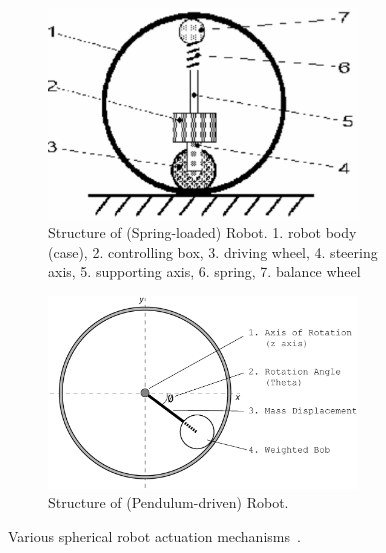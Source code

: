 \documentclass[english, bachelor, utf8]{base/thesis_telematics}
\begin{document}
\begin{figure}[ht]
    \centering
\begin{subfigure}{0.48\textwidth}
    \centering
    \includegraphics[width=0.9\textwidth]{pics/spring_2d.png}
    \caption{Structure of (Spring-loaded) Robot. 1. robot body (case), 2. controlling box, 3. driving wheel, 4. steering axis, 5. supporting axis, 6. spring, 7. balance wheel}
    \label{fig:spring_2D_top}
\end{subfigure}

\begin{subfigure}{0.48\textwidth}
    \centering
    \includegraphics[width=0.9\textwidth]{pics/pendulum_mechanism.png}
    \caption{Structure of (Pendulum-driven) Robot.}
    \label{fig:pendulum_2D}
\end{subfigure}


\caption{Various spherical robot actuation mechanisms~\cite{old_spring_paper}.}
\label{fig:spring_sphere}
\end{figure}
\end{document}
